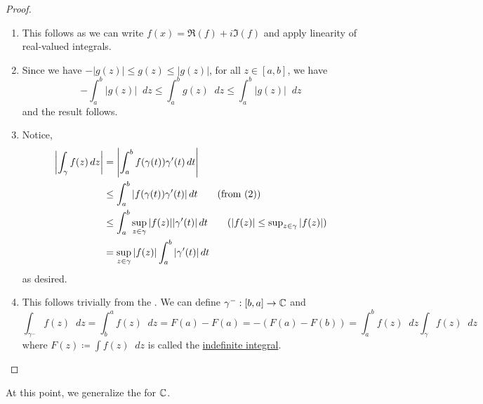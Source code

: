 \documentclass[11pt]{article}
\newcommand*\dif{\mathop{}\!d}
\begin{document}
\begin{proof}\leavevmode
	\begin{enumerate}
		\item This follows as we can write $f(x) = \Re(f) + i\Im(f)$ and apply linearity
			of real-valued integrals.
		\item Since we have $-|g(z)| \leq g(z) \leq |g(z)|$, for all $z \in [a,b]$, we
			have
			\begin{equation*}
				-\int_a^b |g(z)| \dif z \leq \int_a^b g(z) \dif z \leq \int_a^b |g(z)| \dif z
			\end{equation*}
			and the result follows.
		\item Notice,
			\begin{align*}
				\left| \int_\gamma f(z) \dif z\right|
				&= \left| \int_a^b f(\gamma(t))\gamma'(t)\dif t\right|\\
				&\leq \int_a^b |f(\gamma(t))\gamma'(t)| \dif t \tag{from (2)}\\
				&\leq \int_a^b \sup_{z\in\gamma} |f(z)| |\gamma'(t)| \dif t \tag{$|f(z)|\leq
			\sup_{z\in\gamma}|f(z)|$}\\
			&= \sup_{z\in\gamma} |f(z)| \int_a^b |\gamma'(t)| \dif t
		\end{align*}
		as desired.
	\item This follows trivially from the . We can
		define $\gamma^-:[b,a] \to \mathbb{C}$ and
		\begin{equation*}
			\int_{\gamma^-} f(z) \dif z
			= \int_b^a f(z) \dif z
			= F(a) - F(a)
			= -(F(a) - F(b))
			= \int_a^b f(z) \dif z
			\int_{\gamma} f(z) \dif z
		\end{equation*}
		where $F(z) \coloneqq \int f(z) \dif z$ is called the \underline{indefinite
		integral}.
\end{enumerate}
\end{proof}
At this point, we generalize the  for $\mathbb{C}$.
\end{document}
